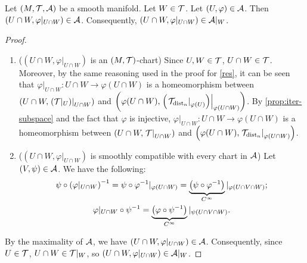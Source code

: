 \documentclass[11pt,reqno]{amsart}
\renewcommand{\phi}{\varphi}
\begin{document}
\begin{lemma}\label{lem:chart-restriction}
Let $(M,\mathcal{T},\mathcal{A})$ be a smooth manifold.
Let $W\in\mathcal{T}$.
Let $(U,\phi)\in\A$.
Then $\Br{U\cap W,\phi|_{U\cap W}}\in\A$.
Consequently,
$\Br{U\cap W,\phi|_{U\cap W}}\in\A|_W$.
\end{lemma}
\begin{proof}
\begin{enumerate}
\item ($(U\cap W,\phi|_{U\cap W})$ is an $(M,\mathcal{T})$-chart)
Since $U,W\in\mathcal{T}$, $U\cap W\in\mathcal{T}$. Moreover, by the same reasoning used
in the proof for \ref{res}, it can be seen that
$\phi|_{U\cap W}:U\cap W\to\phi(U\cap W)$ is a homeomorphism between
$\Br{U\cap W,\eval{\Br{\T|_U}}_{U\cap W}}$ and
$\Br{\phi(U\cap W),\eval{\Br{\eval{\T_{\dist_n}}_{\phi(U)}}}_{\phi(U\cap W)}}$.
By \ref{prop:iter-subspace} and the fact that $\phi$ is injective,
$\phi|_{U\cap W}:U\cap W\to\phi(U\cap W)$ is a homeomorphism between
$\Br{U\cap W,\eval{\T}_{U\cap W}}$ and
$\Br{\phi(U\cap W),\eval{\T_{\dist_n}}_{\phi(U\cap W)}}$.

\item ($(U\cap W,\phi|_{U\cap W})$ is smoothly compatible with
every chart in $\mathcal{A}$)
Let $(V,\psi)\in\mathcal{A}$. We have the following:
\begin{gather*}
\psi\circ\Br{\phi|_{U\cap W}}\inv
=
\psi\circ\phi\inv|_{\phi(U\cap W)}
=
\underbrace{\Br{\psi\circ\phi\inv}}_{C^\infty}|_{\phi(U\cap V\cap W)};\\
\phi|_{U\cap W}\circ\psi\inv
=
\underbrace{\Br{\phi\circ\psi\inv}}_{C^\infty}|_{\psi(U\cap V\cap W)}.
\end{gather*}

\end{enumerate}
By the maximality of $\mathcal{A}$, we have $(U\cap W,\phi|_{U\cap W})\in\A$.
Consequently, since $U\in\mathcal{T}$, $U\cap W\in\mathcal{T}|_W$, so
$\Br{U\cap W,\phi|_{U\cap W}}\in\A|_W$.
\end{proof}
\end{document}
